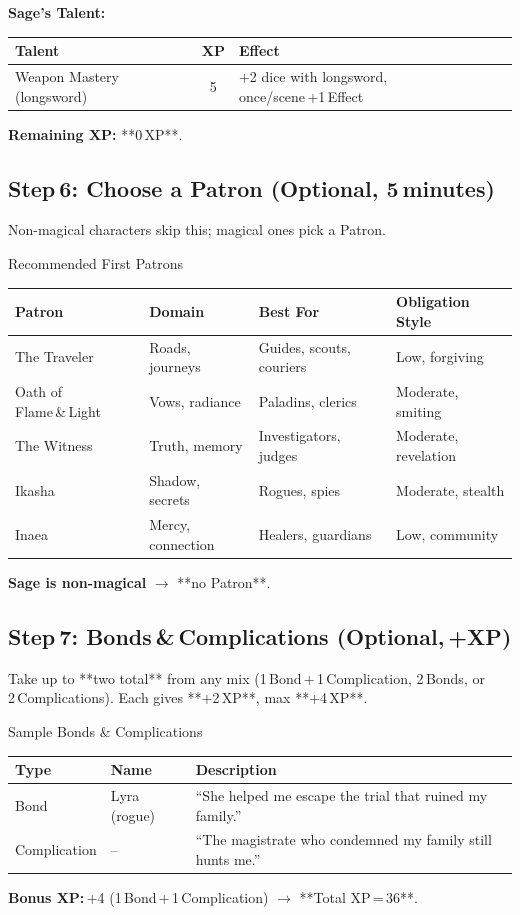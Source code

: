 \documentclass[10pt]{article}
\begin{document}
\textbf{Sage's Talent:}
\begin{tabular}{p{3cm} c p{8cm}}
    \toprule
    \textbf{Talent} & \textbf{XP} & \textbf{Effect}\\
    \midrule
    Weapon Mastery (longsword) & 5 & +2 dice with longsword, once/scene +1 Effect \\
    \bottomrule
\end{tabular}
\textbf{Remaining XP:} **0 XP**.

\subsection*{Step 6: Choose a Patron (Optional, 5 minutes)}
Non-magical characters skip this; magical ones pick a Patron.

\begin{charbox}{Recommended First Patrons}
    \begin{tabular}{p{3cm} p{3cm} p{4cm} p{4cm}}
        \toprule
        \textbf{Patron} & \textbf{Domain} & \textbf{Best For} & \textbf{Obligation Style}\\
        \midrule
        The Traveler       & Roads, journeys               & Guides, scouts, couriers    & Low, forgiving \\
        Oath of Flame \& Light & Vows, radiance        & Paladins, clerics            & Moderate, smiting\\
        The Witness        & Truth, memory                 & Investigators, judges        & Moderate, revelation\\
        Ikasha              & Shadow, secrets               & Rogues, spies               & Moderate, stealth\\
        Inaea               & Mercy, connection             & Healers, guardians          & Low, community\\
        \bottomrule
    \end{tabular}
\end{charbox}
\textbf{Sage is non-magical} $\rightarrow$ **no Patron**.

\subsection*{Step 7: Bonds & Complications (Optional, +XP)}
Take up to **two total** from any mix (1 Bond + 1 Complication, 2 Bonds, or 2 Complications).  
Each gives **+2 XP**, max **+4 XP**.

\begin{charbox}{Sample Bonds \& Complications}
    \begin{tabular}{p{3cm} p{5cm} p{6cm}}
        \toprule
        \textbf{Type} & \textbf{Name} & \textbf{Description}\\
        \midrule
        Bond & Lyra (rogue) & ``She helped me escape the trial that ruined my family.''\\
        Complication & -- & ``The magistrate who condemned my family still hunts me.''\\
        \bottomrule
    \end{tabular}
\end{charbox}
\textbf{Bonus XP:} +4 (1 Bond + 1 Complication) $\rightarrow$ **Total XP = 36**.
\end{document}
